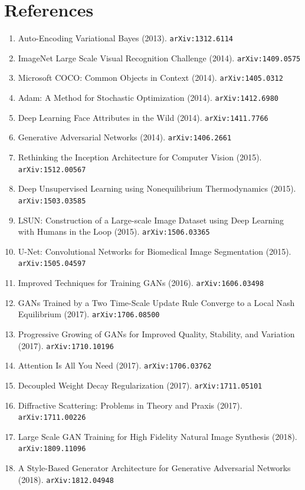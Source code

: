 \documentclass[11pt]{article}
\begin{document}
\section*{References}
\begin{enumerate}\small
  \item Auto-Encoding Variational Bayes (2013). \texttt{arXiv:1312.6114}
  \item ImageNet Large Scale Visual Recognition Challenge (2014). \texttt{arXiv:1409.0575}
  \item Microsoft COCO: Common Objects in Context (2014). \texttt{arXiv:1405.0312}
  \item Adam: A Method for Stochastic Optimization (2014). \texttt{arXiv:1412.6980}
  \item Deep Learning Face Attributes in the Wild (2014). \texttt{arXiv:1411.7766}
  \item Generative Adversarial Networks (2014). \texttt{arXiv:1406.2661}
  \item Rethinking the Inception Architecture for Computer Vision (2015). \texttt{arXiv:1512.00567}
  \item Deep Unsupervised Learning using Nonequilibrium Thermodynamics (2015). \texttt{arXiv:1503.03585}
  \item LSUN: Construction of a Large-scale Image Dataset using Deep Learning
  with Humans in the Loop (2015). \texttt{arXiv:1506.03365}
  \item U-Net: Convolutional Networks for Biomedical Image Segmentation (2015). \texttt{arXiv:1505.04597}
  \item Improved Techniques for Training GANs (2016). \texttt{arXiv:1606.03498}
  \item GANs Trained by a Two Time-Scale Update Rule Converge to a Local Nash
  Equilibrium (2017). \texttt{arXiv:1706.08500}
  \item Progressive Growing of GANs for Improved Quality, Stability, and
  Variation (2017). \texttt{arXiv:1710.10196}
  \item Attention Is All You Need (2017). \texttt{arXiv:1706.03762}
  \item Decoupled Weight Decay Regularization (2017). \texttt{arXiv:1711.05101}
  \item Diffractive Scattering: Problems in Theory and Praxis (2017). \texttt{arXiv:1711.00226}
  \item Large Scale GAN Training for High Fidelity Natural Image Synthesis (2018). \texttt{arXiv:1809.11096}
  \item A Style-Based Generator Architecture for Generative Adversarial Networks (2018). \texttt{arXiv:1812.04948}

\end{enumerate}
\end{document}
